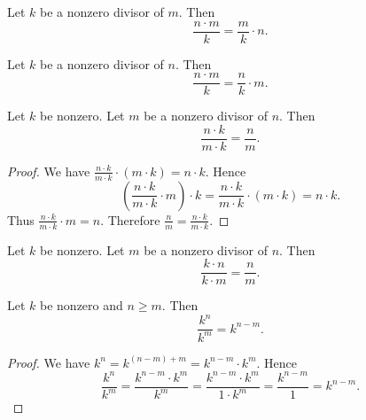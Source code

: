 \documentclass[../../arithmetic.tex]{subfiles}
\begin{document}
\begin{forthel}
    \begin{corollary}\label{Arithmetic_03_05_173047}
      Let $k$ be a nonzero divisor of $m$.
      Then \[ \frac{n \cdot m}{k} = \frac{m}{k} \cdot n. \]
    \end{corollary}

    \begin{corollary}\label{Arithmetic_03_05_401748}
      Let $k$ be a nonzero divisor of $n$.
      Then \[ \frac{n \cdot m}{k} = \frac{n}{k} \cdot m. \]
    \end{corollary}

    \begin{proposition}\label{Arithmetic_03_05_243924}
      Let $k$ be nonzero.
      Let $m$ be a nonzero divisor of $n$.
      Then \[ \frac{n \cdot k}{m \cdot k} = \frac{n}{m}. \]
    \end{proposition}
    \begin{proof}
      We have $\frac{n \cdot k}{m \cdot k} \cdot (m \cdot k) = n \cdot k$.
      Hence
      \[  \left( \frac{n \cdot k}{m \cdot k} \cdot m \right) \cdot k
          = \frac{n \cdot k}{m \cdot k} \cdot (m \cdot k)
          = n \cdot k. \]
      Thus $\frac{n \cdot k}{m \cdot k} \cdot m = n$.
      Therefore $\frac{n}{m} = \frac{n \cdot k}{m \cdot k}$.
    \end{proof}

    \begin{corollary}\label{Arithmetic_03_05_424330}
      Let $k$ be nonzero.
      Let $m$ be a nonzero divisor of $n$.
      Then \[ \frac{k \cdot n}{k \cdot m} = \frac{n}{m}. \]
    \end{corollary}

    \begin{proposition}\label{Arithmetic_03_05_469833}
      Let $k$ be nonzero and $n \geq m$.
      Then \[ \frac{k^{n}}{k^{m}} = k^{n - m}. \]
    \end{proposition}
    \begin{proof}
      We have $k^{n} = k^{(n - m) + m} = k^{n - m} \cdot k^{m}$.
      Hence
      \[  \frac{k^{n}}{k^{m}}
          = \frac{k^{n - m} \cdot k^{m}}{k^{m}}
          = \frac{k^{n - m} \cdot k^{m}}{1 \cdot k^{m}}
          = \frac{k^{n - m}}{1}
          = k^{n - m}. \]
    \end{proof}
  \end{forthel}
\end{document}
